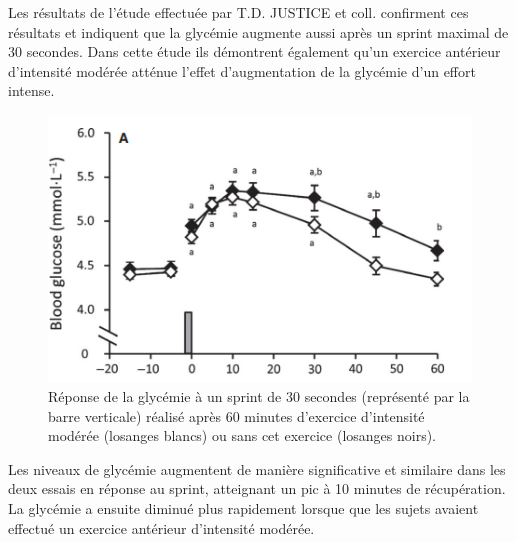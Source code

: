         Les résultats de l'étude effectuée par T.D. JUSTICE et coll. \cite{justice15} confirment ces résultats et indiquent que la glycémie augmente aussi après un sprint maximal de 30 secondes. Dans cette étude ils démontrent également qu'un exercice antérieur d'intensité modérée atténue l'effet d'augmentation de la glycémie d'un effort intense.
        
        \begin{figure}[H]
            \centering
            \includegraphics[scale=0.9]{images/glycemie_posteffort2.PNG}
            \caption{\label{fig:glycemie_posteffort2} Réponse de la glycémie à un sprint de 30 secondes (représenté par la barre verticale) réalisé après 60 minutes d'exercice d'intensité  modérée (losanges blancs) ou sans cet exercice (losanges noirs).}
        \end{figure} 
        
         Les niveaux de glycémie augmentent de manière significative et similaire dans les deux essais en réponse au sprint, atteignant un pic à 10 minutes de récupération. La glycémie a ensuite diminué plus rapidement lorsque que les sujets avaient effectué un exercice antérieur d'intensité modérée.


